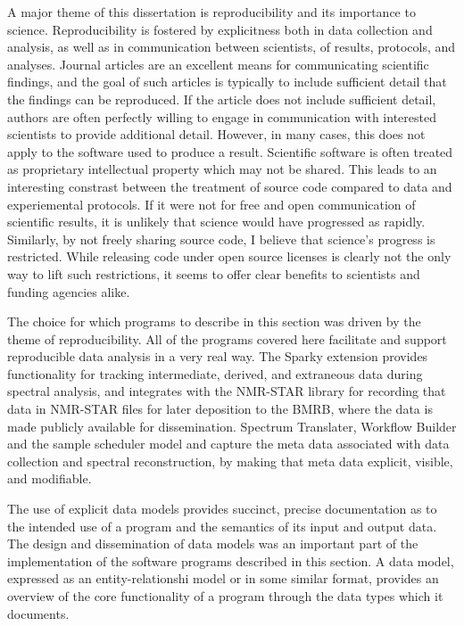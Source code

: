 A major theme of this dissertation is reproducibility and its importance to
science.  Reproducibility is fostered by explicitness both in data collection
and analysis, as well as in communication between scientists, of results, 
protocols, and analyses.  Journal articles are an excellent means for 
communicating scientific findings, and the goal of such articles is typically
to include sufficient detail that the findings can be reproduced.  If the
article does not include sufficient detail, authors are often perfectly willing
to engage in communication with interested scientists to provide additional
detail.  However, in many cases, this does not apply to the software used to
produce a result.  Scientific software is often treated as proprietary 
intellectual property which may not be shared.  This leads to an interesting
constrast between the treatment of source code compared to data and experiemental
protocols.  If it were not for free and open communication of scientific results,
it is unlikely that science would have progressed as rapidly.  Similarly, by not
freely sharing source code, I believe that science's progress is restricted. 
While releasing code under open source licenses is clearly not the only way to
lift such restrictions, it seems to offer clear benefits to scientists and
funding agencies alike.

The choice for which programs to describe in this section was driven by the
theme of reproducibility.  All of the programs covered here facilitate and 
support reproducible data analysis in a very real way.  The Sparky extension
provides functionality for tracking intermediate, derived, and extraneous data
during spectral analysis, and integrates with the NMR-STAR library for recording
that data in NMR-STAR files for later deposition to the BMRB, where the data is
made publicly available for dissemination.  Spectrum Translater, Workflow Builder
and the sample scheduler model and capture the meta data associated with 
data collection and spectral reconstruction, by making that meta data explicit,
visible, and modifiable.

The use of explicit data models provides succinct, precise documentation as to
the intended use of a program and the semantics of its input and output data.
The design and dissemination of data models was an important part of the
implementation of the software programs described in this section.  A data 
model, expressed as an entity-relationshi model or in some similar format, 
provides an overview of the core functionality of a program through the data 
types which it documents.

